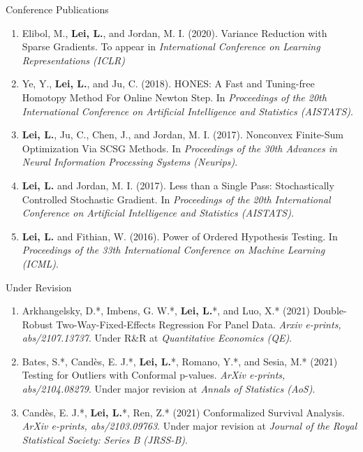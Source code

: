 \documentclass{article}
\begin{document}
\begin{large}
\noindent Conference Publications
\end{large}

\begin{enumerate}
\item Elibol, M., \textbf{Lei, L.}, and Jordan, M. I. (2020). Variance Reduction with Sparse Gradients. To appear in \emph{International Conference on Learning Representations (ICLR)}
\item Ye, Y., \textbf{Lei, L.}, and Ju, C. (2018). HONES: A Fast and Tuning-free Homotopy Method For Online Newton Step. In \emph{Proceedings of the 20th International Conference on Artificial Intelligence and Statistics (AISTATS)}.
\item \textbf{Lei, L.}, Ju, C., Chen, J., and Jordan, M. I. (2017). Nonconvex Finite-Sum Optimization Via SCSG Methods. In \emph{Proceedings of the 30th Advances in Neural Information Processing Systems (Neurips)}.
\item \textbf{Lei, L.} and Jordan, M. I. (2017). Less than a Single Pass: Stochastically Controlled Stochastic Gradient. In \emph{Proceedings of the 20th International Conference on Artificial Intelligence and Statistics (AISTATS)}.
\item \textbf{Lei, L.} and Fithian, W. (2016). Power of Ordered Hypothesis Testing. In \emph{Proceedings of the 33th International Conference on Machine Learning (ICML)}.
\end{enumerate}

\begin{large}
\noindent Under Revision
\end{large}

\begin{enumerate}
\item Arkhangelsky, D.*, Imbens, G. W.*, \textbf{Lei, L.}*, and Luo, X.* (2021) Double-Robust Two-Way-Fixed-Effects Regression For Panel Data. \emph{Arxiv e-prints, abs/2107.13737}. Under R\&R at \emph{Quantitative Economics (QE)}.
\item Bates, S.*, Cand\`{e}s, E. J.*, \textbf{Lei, L.}*, Romano, Y.*, and Sesia, M.* (2021) Testing for Outliers with Conformal p-values. \emph{ArXiv e-prints, abs/2104.08279}. Under major revision at \emph{Annals of Statistics (AoS)}.
\item Cand\`{e}s, E. J.*, \textbf{Lei, L.}*, Ren, Z.* (2021) Conformalized Survival Analysis. \emph{ArXiv e-prints, abs/2103.09763}. Under major revision at \emph{Journal of the Royal Statistical Society: Series B (JRSS-B)}.
\end{enumerate}
\end{document}
